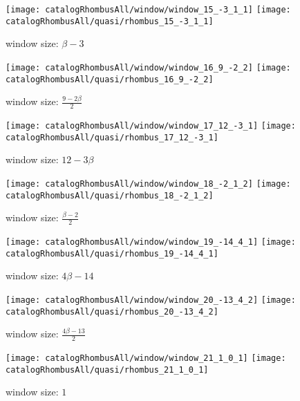 \documentclass[text.tex]{subfiles}
\begin{document}
\begin{landscape}
\begin{figure}[h!]
\centering
\texttt{[image: catalogRhombusAll/window/window\_15\_-3\_1\_1]}
\texttt{[image: catalogRhombusAll/quasi/rhombus\_15\_-3\_1\_1]}
\caption*{window size: $\beta-3$}
\end{figure}

\begin{figure}[h!]
\centering
\texttt{[image: catalogRhombusAll/window/window\_16\_9\_-2\_2]}
\texttt{[image: catalogRhombusAll/quasi/rhombus\_16\_9\_-2\_2]}
\caption*{window size: $\frac{9-2\beta}{2}$}
\end{figure}

\begin{figure}[h!]
\centering
\texttt{[image: catalogRhombusAll/window/window\_17\_12\_-3\_1]}
\texttt{[image: catalogRhombusAll/quasi/rhombus\_17\_12\_-3\_1]}
\caption*{window size: $12-3\beta$}
\end{figure}

\begin{figure}[h!]
\centering
\texttt{[image: catalogRhombusAll/window/window\_18\_-2\_1\_2]}
\texttt{[image: catalogRhombusAll/quasi/rhombus\_18\_-2\_1\_2]}
\caption*{window size: $\frac{\beta-2}{2}$}
\end{figure}

\begin{figure}[h!]
\centering
\texttt{[image: catalogRhombusAll/window/window\_19\_-14\_4\_1]}
\texttt{[image: catalogRhombusAll/quasi/rhombus\_19\_-14\_4\_1]}
\caption*{window size: $4\beta-14$}
\end{figure}

\begin{figure}[h!]
\centering
\texttt{[image: catalogRhombusAll/window/window\_20\_-13\_4\_2]}
\texttt{[image: catalogRhombusAll/quasi/rhombus\_20\_-13\_4\_2]}
\caption*{window size: $\frac{4\beta-13}{2}$}
\end{figure}

\begin{figure}[h!]
\centering
\texttt{[image: catalogRhombusAll/window/window\_21\_1\_0\_1]}
\texttt{[image: catalogRhombusAll/quasi/rhombus\_21\_1\_0\_1]}
\caption*{window size: $1$}
\end{figure}
\end{landscape}
\end{document}
